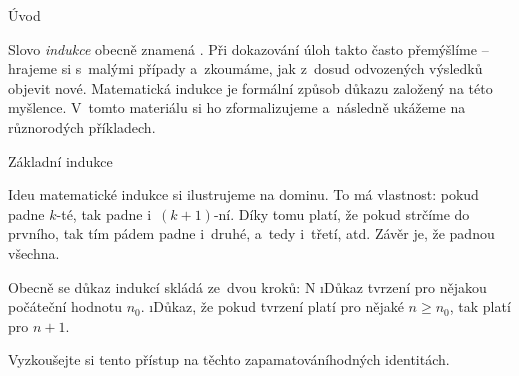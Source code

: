 





\sec Úvod

Slovo \textit{indukce} obecně znamená . Při dokazování úloh takto často přemýšlíme -- hrajeme si s~malými případy a~zkoumáme, jak z~dosud odvozených výsledků objevit nové. Matematická indukce je formální způsob důkazu založený na této myšlence. V~tomto materiálu si ho zformalizujeme a~následně ukážeme na různorodých příkladech.

\sec Základní indukce

Ideu matematické indukce si ilustrujeme na dominu. To má vlastnost: pokud padne $k$-té, tak padne i~$(k+1)$-ní. Díky tomu platí, že pokud strčíme do prvního, tak tím pádem padne i~druhé, a~tedy i~třetí, atd. Závěr je, že padnou všechna. 


Obecně se důkaz indukcí skládá ze~dvou kroků:
\begitems \style N
\i Důkaz tvrzení pro nějakou počáteční hodnotu $n_0$.
\i Důkaz, že pokud tvrzení platí pro nějaké $n \ge n_0$, tak platí pro $n+1$.
\enditems

Vyzkoušejte si tento přístup na těchto zapamatováníhodných identitách.


